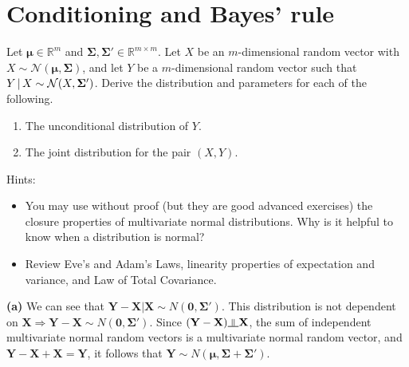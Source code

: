 \documentclass[submit]{harvardml}
\newcommand{\R}{\mathbb{R}}
\renewcommand{\v}[1]{\mathbf{#1}}
\newcommand{\indep}{\rotatebox[origin=c]{90}{$\models$}}
\begin{document}
\newpage
\section*{Conditioning and Bayes' rule}
\begin{problem}
  Let $\v \mu \in \R^m$ and
  $\v \Sigma, \v \Sigma' \in \R^{m \times m}$.  Let $X$ be an
  $m$-dimensional random vector with
  $X \sim \mathcal{N}(\v \mu, \v \Sigma)$, and let $Y$ be a
  $m$-dimensional random vector such that
  $Y \given X \sim \mathcal{N}(X, \v \Sigma')$. Derive the
  distribution and parameters for each of the following.

\begin{enumerate}[label=(\alph*)]
  \item The unconditional distribution of $Y$.

  \item The joint distribution for the pair $(X,Y)$.

\end{enumerate}

Hints:
\begin{itemize}
\item You may use without proof (but they are good advanced exercises)
  the closure properties of multivariate normal distributions. Why is
  it helpful to know when a distribution is normal?
\item Review Eve's and Adam's Laws, linearity properties of
  expectation and variance, and Law of Total Covariance.

\end{itemize}

\end{problem}




\textbf{(a)} We can see that $\mathbf{Y}-\mathbf{X}|\mathbf{X}\sim N(\mathbf{0},\mathbf{\Sigma}')$. This distribution is not dependent on $\mathbf{X} \Rightarrow \mathbf{Y}-\mathbf{X}\sim N(\mathbf{0},\mathbf{\Sigma}')$. Since $(\mathbf{Y}-\mathbf{X})\indep \mathbf{X}$, the sum of independent multivariate normal random vectors is a multivariate normal random vector, and $\mathbf{Y}-\mathbf{X}+\mathbf{X}=\mathbf{Y}$, it follows that $\mathbf{Y}\sim N(\boldsymbol{\mu}, \mathbf{\Sigma}+\mathbf{\Sigma}')$.\\\\\\
\end{document}
